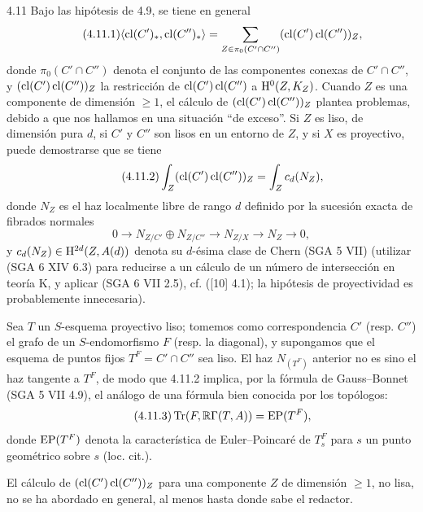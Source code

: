 \begin{statement}{4.11}
Bajo las hipótesis de 4.9, se tiene en general
\begin{equation}
\tag{4.11.1}
\langle \operatorname{cl}(C')_*,\operatorname{cl}(C'')_*\rangle
=
\sum_{Z\in\pi_0(C'\cap C'')}(\operatorname{cl}(C')\operatorname{cl}(C''))_Z,
\end{equation}
donde $\pi_0(C'\cap C'')$ denota el conjunto de las componentes conexas de $C'\cap C''$, y $(\operatorname{cl}(C')\operatorname{cl}(C''))_Z$ la restricción de $\operatorname{cl}(C')\operatorname{cl}(C'')$ a $\mathrm{H}^0(Z,K_Z)$. Cuando $Z$ es una componente de dimensión $\geq 1$, el cálculo de $(\operatorname{cl}(C')\operatorname{cl}(C''))_Z$ plantea problemas, debido a que nos hallamos en una situación ``de exceso''. Si $Z$ es liso, de dimensión pura $d$, si $C'$ y $C''$ son lisos en un entorno de $Z$, y si $X$ es proyectivo, puede demostrarse que se tiene
\begin{equation}
\tag{4.11.2}
\int_Z(\operatorname{cl}(C')\operatorname{cl}(C''))_Z=\int_Z c_d(N_Z),
\end{equation}
donde $N_Z$ es el haz localmente libre de rango $d$ definido por la sucesión exacta de fibrados normales
\[
0\longrightarrow N_{Z/C'}\oplus N_{Z/C''}\longrightarrow N_{Z/X}\longrightarrow N_Z\longrightarrow 0,
\]
y $c_d(N_Z)\in \mathrm{H}^{2d}(Z,A(d))$ denota su $d$-ésima clase de Chern (SGA 5 VII) (utilizar (SGA 6 XIV 6.3) para reducirse a un cálculo de un número de intersección en teoría K, y aplicar (SGA 6 VII 2.5), cf. ([10] 4.1); la hipótesis de proyectividad es probablemente innecesaria).

Sea $T$ un $S$-esquema proyectivo liso; tomemos como correspondencia $C'$ (resp. $C''$) el grafo de un $S$-endomorfismo $F$ (resp. la diagonal), y supongamos que el esquema de puntos fijos $T^F=C'\cap C''$ sea liso. El haz $N_{(T^F)}$ anterior no es sino el haz tangente a $T^F$, de modo que 4.11.2 implica, por la fórmula de Gauss--Bonnet (SGA 5 VII 4.9), el análogo de una fórmula bien conocida por los topólogos:
\begin{equation}
\tag{4.11.3}
\operatorname{Tr}(F,\mathbb{R}\Gamma(T,A))=\operatorname{EP}(T^F),
\end{equation}
donde $\operatorname{EP}(T^F)$ denota la característica de Euler--Poincaré de $T_s^F$ para $s$ un punto geométrico sobre $s$ (loc. cit.).
\end{statement}

El cálculo de $(\operatorname{cl}(C')\operatorname{cl}(C''))_Z$ para una componente $Z$ de dimensión $\geq 1$, no lisa, no se ha abordado en general, al menos hasta donde sabe el redactor.

